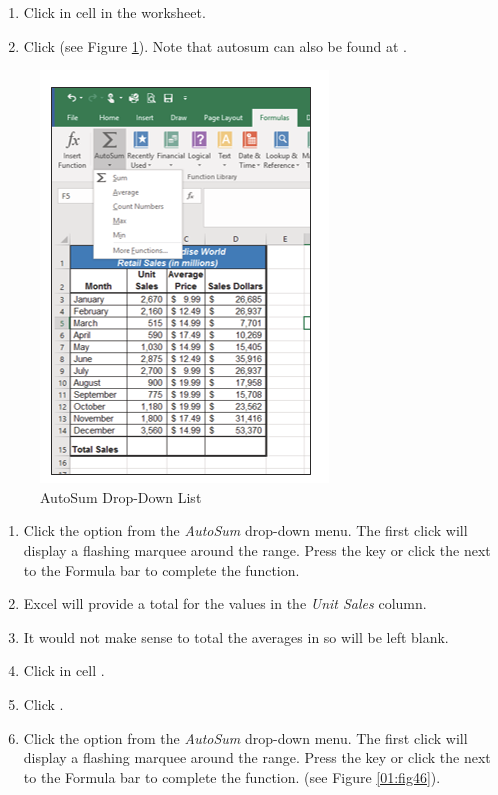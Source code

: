 \begin{enumerate}
	\item Click in cell  in the  worksheet.
	\item Click  (see Figure \ref{01:fig45}). Note that autosum can also be found at .
\end{enumerate}

\begin{figure}[H]
	\centering
	\includegraphics[width=\maxwidth{.95\linewidth}]{gfx/ch01_fig45}
	\caption{AutoSum Drop-Down List}
	\label{01:fig45}
\end{figure}

\begin{enumerate}[resume]
	\item Click the  option from the \textit{AutoSum} drop-down menu. The first click will display a flashing marquee around the range. Press the  key or click the  next to the Formula bar to complete the function.
	\item Excel will provide a total for the values in the \textit{Unit Sales} column.
	\item It would not make sense to total the averages in  so  will be left blank.
	\item Click in cell . 
	\item Click . 
	\item Click the  option from the \textit{AutoSum} drop-down menu. The first click will display a flashing marquee around the range. Press the  key or click the  next to the Formula bar to complete the function. (see Figure \ref{01:fig46}).
\end{enumerate}

